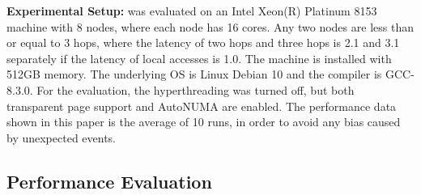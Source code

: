 \textbf{Experimental Setup:}  \NM{} was evaluated on an Intel Xeon(R) Platinum 8153 machine with 8 nodes, where each node has 16 cores. Any two nodes are less than or equal to 3 hops, where the latency of two hops and three hops is 2.1 and 3.1 separately if the latency of local accesses is 1.0. The machine is installed with 512GB memory. The underlying OS is Linux Debian 10 and the compiler is GCC-8.3.0. For the evaluation, the hyperthreading was turned off, but both transparent page support and AutoNUMA are  enabled. The performance data shown in this paper is the average of 10 runs, in order to avoid any bias caused by unexpected events.  

\subsection{Performance Evaluation}

